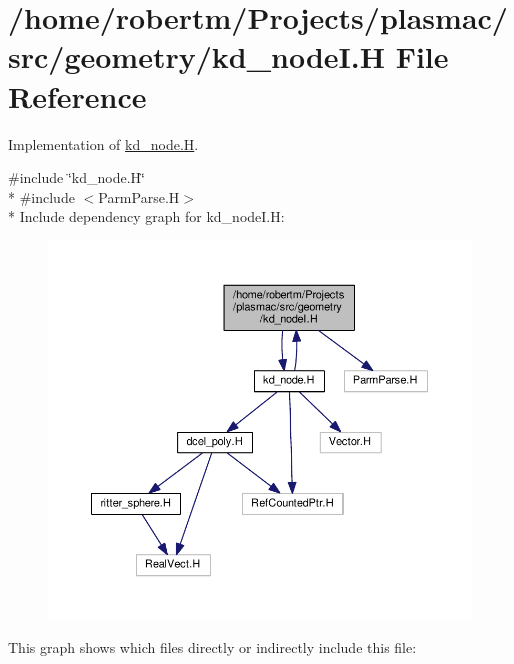 \hypertarget{kd__nodeI_8H}{}\section{/home/robertm/\+Projects/plasmac/src/geometry/kd\+\_\+nodeI.H File Reference}
\label{kd__nodeI_8H}


Implementation of \hyperlink{kd__node_8H}{kd\+\_\+node.\+H}.  


{\ttfamily \#include \char`\"{}kd\+\_\+node.\+H\char`\"{}}\\*
{\ttfamily \#include $<$Parm\+Parse.\+H$>$}\\*
Include dependency graph for kd\+\_\+node\+I.\+H\+:\nopagebreak
\begin{figure}[H]
\begin{center}
\leavevmode
\includegraphics[width=350pt]{kd__nodeI_8H__incl}
\end{center}
\end{figure}
This graph shows which files directly or indirectly include this file\+:\nopagebreak
